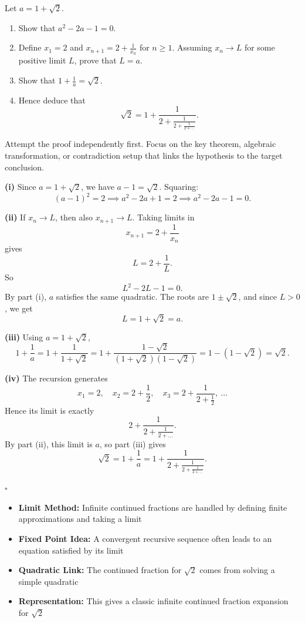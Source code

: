 
\begin{problem}
Let $a = 1 + \sqrt{2}$.
\begin{enumerate}[label=(\roman*)]
    \item Show that $a^2 - 2a - 1 = 0$.
    \item Define $x_1 = 2$ and $x_{n+1} = 2 + \frac{1}{x_n}$ for $n \geq 1$. Assuming $x_n \to L$ for some positive limit $L$, prove that $L = a$.
    \item Show that $1 + \frac{1}{a} = \sqrt{2}$.
    \item Hence deduce that
    \[
    \sqrt{2} = 1 + \frac{1}{2 + \frac{1}{2 + \frac{1}{2 + \dots}}}.
    \]
\end{enumerate}
\end{problem}

\begin{hint}
Attempt the proof independently first. Focus on the key theorem, algebraic transformation, or contradiction setup that links the hypothesis to the target conclusion.
\end{hint}

\begin{solution}
\textbf{(i)} Since $a = 1+\sqrt{2}$, we have $a-1=\sqrt{2}$. Squaring:
\[
(a-1)^2=2 \implies a^2-2a+1=2 \implies a^2-2a-1=0.
\]

\textbf{(ii)} If $x_n \to L$, then also $x_{n+1} \to L$. Taking limits in
\[
x_{n+1}=2+\frac{1}{x_n}
\]
gives
\[
L=2+\frac{1}{L}.
\]
So
\[
L^2-2L-1=0.
\]
By part (i), $a$ satisfies the same quadratic. The roots are $1\pm\sqrt{2}$, and since $L>0$, we get
\[
L=1+\sqrt{2}=a.
\]

\textbf{(iii)} Using $a=1+\sqrt{2}$,
\[
1+\frac{1}{a}=1+\frac{1}{1+\sqrt{2}}
=1+\frac{1-\sqrt{2}}{(1+\sqrt{2})(1-\sqrt{2})}
=1-(1-\sqrt{2})=\sqrt{2}.
\]

\textbf{(iv)} The recursion generates
\[
x_1=2,\quad x_2=2+\frac{1}{2},\quad x_3=2+\frac{1}{2+\frac{1}{2}},\ \dots
\]
Hence its limit is exactly
\[
2+\frac{1}{2+\frac{1}{2+\dots}}.
\]
By part (ii), this limit is $a$, so part (iii) gives
\[
\sqrt{2}=1+\frac{1}{a}
=1+\frac{1}{2+\frac{1}{2+\frac{1}{2+\dots}}}.
\]

\hfill $\square$
\end{solution}

\begin{takeaways}
\begin{itemize}
\item \textbf{Limit Method:} Infinite continued fractions are handled by defining finite approximations and taking a limit
\item \textbf{Fixed Point Idea:} A convergent recursive sequence often leads to an equation satisfied by its limit
\item \textbf{Quadratic Link:} The continued fraction for $\sqrt{2}$ comes from solving a simple quadratic
\item \textbf{Representation:} This gives a classic infinite continued fraction expansion for $\sqrt{2}$
\end{itemize}
\end{takeaways}
